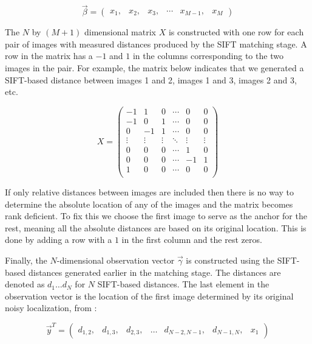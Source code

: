 \documentclass[10pt,twocolumn,letterpaper]{article}
\begin{document}

\[\vec{\beta} =
\begin{pmatrix}
  x_1, & x_2, & x_3, & \cdots & x_{M-1}, & x_M
\end{pmatrix}
\]

The $N$ by $(M+1)$ dimensional matrix $X$ is constructed with one row
for each pair of images with measured distances produced by the SIFT
matching stage. A row in the matrix has a $-1$ and $1$ in the columns
corresponding to the two images in the pair. For example, the matrix
below indicates that we generated a SIFT-based distance between images
1 and 2, images 1 and 3, images 2 and 3, etc.

\[
X =
\begin{pmatrix}
  -1 & 1 & 0 & \cdots & 0 & 0\\
  -1 & 0 & 1 & \cdots & 0 & 0\\
  0 & -1 & 1 & \cdots & 0 & 0\\
  \vdots  & \vdots & \vdots & \ddots & \vdots  & \vdots\\
  0 & 0 & 0 & \cdots & 1 & 0 \\
  0 & 0 & 0 & \cdots & -1 & 1 \\
  1 & 0 & 0 & \cdots & 0 & 0 \\
\end{pmatrix}
\]

If only relative distances between images are included then there is
no way to determine the absolute location of any of the images and the
matrix becomes rank deficient. To fix this we choose the first image
to serve as the anchor for the rest, meaning all the absolute
distances are based on its original location. This is done by adding a
row with a $1$ in the first column and the rest zeros.

Finally, the $N$-dimensional observation vector $\vec{\gamma}$ is
constructed using the SIFT-based distances generated earlier in the
matching stage. The distances are denoted as $d_1 \dots d_N$ for $N$
SIFT-based distances. The last element in the observation vector is
the location of the first image determined by its original noisy
localization, from \cite{chen2010indoor, liu2010indoor}:

\[
\vec{y}^T =
\begin{pmatrix}
  d_{1,2}, &d_{1,3}, &d_{2,3}, &\hdots &d_{N-2,N-1}, &d_{N-1,N}, &x_1
\end{pmatrix}
\]
\end{document}
